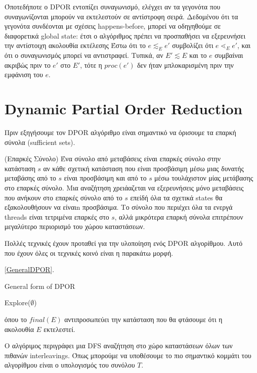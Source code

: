 Όποτεδήποτε ο DPOR εντοπίζει συναγωνισμό, ελέγχει αν τα γεγονότα που συναγωνίζονται μπορούν να εκτελεστούν σε αντίστροφη σειρά.
Δεδομένου ότι τα γεγονότα συνδέονται με σχέσεις happens-before, μπορεί να οδηγηθούμε σε διαφορετικά
global state: έτσι ο αλγόριθμος πρέπει να προσπαθήσει να εξερευνήσει την αντίστοιχη ακολουθία εκτέλεσης
Έστω ότι το $e \lesssim_E e'$ συμβολίζει ότι
$e \lessdot_E e'$, και ότι ο συναγωνισμός μπορεί να αντιστραφεί. Τυπικά, αν $E' \lesssim E$
και το $e$ συμβαίναι ακριβώς πριν το $e'$ στο $E'$, τότε η $proc(e')$ δεν ήταν μπλοκαρισμένη
πριν την εμφάνιση του $e$.


\section{Dynamic Partial Order Reduction}

Πριν εξηγήσουμε τον DPOR αλγόριθμο είναι σημαντικό να όρισουμε τα επαρκή σύνολα (sufficient sets).

\begin{definition}{(Επαρκές Σύνολο)}
Ένα σύνολο από μεταβάσεις είναι επαρκές σύνολο στην κατάσταση $s$ αν κάθε σχετική κατάσταση που είναι προσβάσιμη μέσω μιας δυνατής μεταβάσης από το
$s$ είναι προσβάσιμη και από το $s$ μέσω τουλάχιστον μίας μετάβασης στο επαρκές σύνολο.
Μια αναζήτηση χρειάαζεται να εξερευνήσεις μόνο μεταβάσεις που ανήκουν στο επαρκές σύνολο από το 
$s$ επείδή όλα τα σχετικά states θα εξακολουθήσουν να είναιn
προσβάσιμα. Το σύνολο που περιέχει όλα τα ενεργά threads είναι τετριμένα επαρκές στο 
$s$, αλλά μικρότερα επαρκή σύνολα επιτρέπουν μεγαλύτερο περιορισμό του χώρου καταστάσεων.
\end{definition}

Πολλές τεχνικές έχουν προταθεί για την υλοποίηση ενός DPOR αλγορίθμου. Αυτό που έχουν όλες οι τεχνικές κοινό είναι η παρακάτω μορφή.

\ref{GeneralDPOR}.

\begin{algorithm}[H]
    \caption{General form of DPOR}
    \label{GeneralDPOR}
    Explore($\emptyset$)\;
\end{algorithm}

όπου το $final(E)$ αντιπροσωπεύει την κατάσταση που θα φτάσουμε ότι η ακολουθία $E$ εκτελεστεί.

Ο αλγόριμος περιγράφει μια DFS αναζήτηση στο χώρο καταστάσεων όλων των πιθανών interleavings.
Όπως μπορούμε να υποθέσουμε το πιο σημαντικό κομμάτι του αλγορίθμου είναι ο υπολογισμός του συνόλου $T$.

